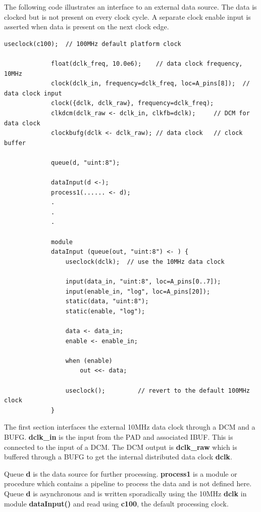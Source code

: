         The following code illustrates an interface to an external data source.
        The data is clocked but is not present on every clock cycle. A separate
        clock enable input is asserted when data is present on the next clock
        edge.
        \begin{lstlisting}[gobble=8, language=threepl]
             useclock(c100);  // 100MHz default platform clock

             float(dclk_freq, 10.0e6);    // data clock frequency, 10MHz
             clock(dclk_in, frequency=dclk_freq, loc=A_pins[8]);  // data clock input
             clock({dclk, dclk_raw}, frequency=dclk_freq);
             clkdcm(dclk_raw <- dclk_in, clkfb=dclk);     // DCM for data clock
             clockbufg(dclk <- dclk_raw); // data clock   // clock buffer

             queue(d, "uint:8");

             dataInput(d <-);
             process1(...... <- d);
             .
             .
             .

             module
             dataInput (queue(out, "uint:8") <- ) {
                 useclock(dclk);  // use the 10MHz data clock

                 input(data_in, "uint:8", loc=A_pins[0..7]);
                 input(enable_in, "log", loc=A_pins[20]);
                 static(data, "uint:8");
                 static(enable, "log");

                 data <- data_in;
                 enable <- enable_in;

                 when (enable)
                     out <<- data;

                 useclock();         // revert to the default 100MHz clock
             }
        \end{lstlisting}
        The first section interfaces the external 10MHz data clock through a
        DCM and a BUFG. {\bf dclk\_in} is the input from the PAD and associated
        IBUF. This is connected to the input of a DCM. The DCM output is
        {\bf dclk\_raw} which is buffered through a BUFG to get the internal
        distributed data clock {\bf dclk}.
        
        Queue {\bf d} is the data source for further processing. {\bf process1}
        is a module or procedure which contains a pipeline to process the data
        and is not defined here. Queue {\bf d} is asynchronous and is written
        sporadically using the 10MHz {\bf dclk} in module {\bf dataInput()} and
        read using {\bf c100}, the default processing clock.
        
